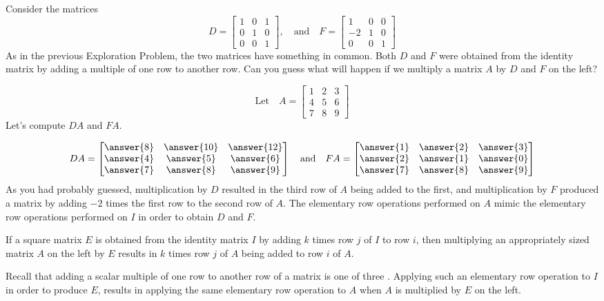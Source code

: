 \documentclass{ximera}
\begin{document}
\begin{initprob}\label{init:elementarymat1}
Consider the matrices
$$
D = \begin{bmatrix}  
 1&0&1\\0&1&0\\0&0&1
 \end{bmatrix},
 \quad \text{and}\quad
F =  \begin{bmatrix}  
 1&0&0\\-2&1&0\\0&0&1
 \end{bmatrix}
$$
As in the previous Exploration Problem, the two matrices have something in common.  Both $D$ and $F$ were obtained from the identity matrix by adding a multiple of one row to another row.  Can you guess what will happen if we multiply a matrix $A$ by $D$ and $F$ on the left?

$$\text{Let}\quad A = \begin{bmatrix}  
 1&2&3\\4&5&6\\7&8&9
 \end{bmatrix}$$
Let's compute $DA$ and $FA$.

$$DA=\begin{bmatrix}\answer{8} & \answer{10} & \answer{12} \\ \answer{4} & \answer{5} & \answer{6}\\ \answer{7} & \answer{8} & \answer{9}\end{bmatrix}
\quad
\text{and}
\quad
FA=\begin{bmatrix}\answer{1} & \answer{2} & \answer{3} \\ \answer{2} & \answer{1} & \answer{0}\\ \answer{7} & \answer{8} & \answer{9}\end{bmatrix}$$
As you had probably guessed, multiplication by $D$ resulted in the third row of $A$ being added to the first, and multiplication by $F$ produced a matrix by adding $-2$ times the first row to the second row of $A$.  The elementary row operations performed on $A$ mimic the elementary row operations performed on $I$ in order to obtain $D$ and $F$.
 \end{initprob}

\begin{general} If a square matrix $E$ is obtained from the identity matrix $I$ by adding $k$ times row $j$ of $I$ to row $i$,  then multiplying an appropriately sized matrix $A$ on the left by $E$ results in $k$ times row $j$ of $A$ being added to row $i$ of $A$.  
 
 Recall that adding a scalar multiple of one row to another row of a matrix is one of three .  Applying such an elementary row operation to $I$ in order to produce $E$, results in applying the same elementary row operation to $A$ when $A$ is multiplied by $E$ on the left.
 \end{general}
\end{document}
